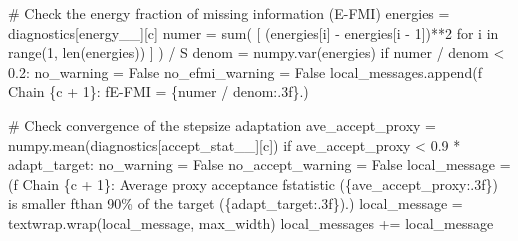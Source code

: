 \documentclass[
  letterpaper,
  DIV=11,
  numbers=noendperiod]{scrartcl}
\newenvironment{Shaded}{\begin{snugshade}}{\end{snugshade}}
\newcommand{\BuiltInTok}[1]{\textcolor[rgb]{0.00,0.23,0.31}{#1}}
\newcommand{\CommentTok}[1]{\textcolor[rgb]{0.37,0.37,0.37}{#1}}
\newcommand{\ControlFlowTok}[1]{\textcolor[rgb]{0.00,0.23,0.31}{#1}}
\newcommand{\DecValTok}[1]{\textcolor[rgb]{0.68,0.00,0.00}{#1}}
\newcommand{\FloatTok}[1]{\textcolor[rgb]{0.68,0.00,0.00}{#1}}
\newcommand{\KeywordTok}[1]{\textcolor[rgb]{0.00,0.23,0.31}{#1}}
\newcommand{\NormalTok}[1]{\textcolor[rgb]{0.00,0.23,0.31}{#1}}
\newcommand{\OperatorTok}[1]{\textcolor[rgb]{0.37,0.37,0.37}{#1}}
\newcommand{\SpecialCharTok}[1]{\textcolor[rgb]{0.37,0.37,0.37}{#1}}
\newcommand{\SpecialStringTok}[1]{\textcolor[rgb]{0.13,0.47,0.30}{#1}}
\newcommand{\StringTok}[1]{\textcolor[rgb]{0.13,0.47,0.30}{#1}}
\newcommand{\VariableTok}[1]{\textcolor[rgb]{0.07,0.07,0.07}{#1}}
\begin{document}
\begin{Shaded}
\begin{Highlighting}[]
    \CommentTok{\# Check the energy fraction of missing information (E{-}FMI)}
\NormalTok{    energies }\OperatorTok{=}\NormalTok{ diagnostics[}\StringTok{\textquotesingle{}energy\_\_\textquotesingle{}}\NormalTok{][c]}
\NormalTok{    numer }\OperatorTok{=} \BuiltInTok{sum}\NormalTok{( [ (energies[i] }\OperatorTok{{-}}\NormalTok{ energies[i }\OperatorTok{{-}} \DecValTok{1}\NormalTok{])}\OperatorTok{**}\DecValTok{2} 
                   \ControlFlowTok{for}\NormalTok{ i }\KeywordTok{in} \BuiltInTok{range}\NormalTok{(}\DecValTok{1}\NormalTok{, }\BuiltInTok{len}\NormalTok{(energies)) ] ) }\OperatorTok{/}\NormalTok{ S}
\NormalTok{    denom }\OperatorTok{=}\NormalTok{ numpy.var(energies)}
    \ControlFlowTok{if}\NormalTok{ numer }\OperatorTok{/}\NormalTok{ denom }\OperatorTok{\textless{}} \FloatTok{0.2}\NormalTok{:}
\NormalTok{      no\_warning }\OperatorTok{=} \VariableTok{False}
\NormalTok{      no\_efmi\_warning }\OperatorTok{=} \VariableTok{False}
\NormalTok{      local\_messages.append(}\SpecialStringTok{f\textquotesingle{}  Chain }\SpecialCharTok{\{}\NormalTok{c }\OperatorTok{+} \DecValTok{1}\SpecialCharTok{\}}\SpecialStringTok{: \textquotesingle{}}
                            \SpecialStringTok{f\textquotesingle{}E{-}FMI = }\SpecialCharTok{\{}\NormalTok{numer }\OperatorTok{/}\NormalTok{ denom}\SpecialCharTok{:.3f\}}\SpecialStringTok{.\textquotesingle{}}\NormalTok{)}
    
    \CommentTok{\# Check convergence of the stepsize adaptation}
\NormalTok{    ave\_accept\_proxy }\OperatorTok{=}\NormalTok{ numpy.mean(diagnostics[}\StringTok{\textquotesingle{}accept\_stat\_\_\textquotesingle{}}\NormalTok{][c])}
    \ControlFlowTok{if}\NormalTok{ ave\_accept\_proxy }\OperatorTok{\textless{}} \FloatTok{0.9} \OperatorTok{*}\NormalTok{ adapt\_target:}
\NormalTok{      no\_warning }\OperatorTok{=} \VariableTok{False}
\NormalTok{      no\_accept\_warning }\OperatorTok{=} \VariableTok{False}
\NormalTok{      local\_message }\OperatorTok{=}\NormalTok{ (}\SpecialStringTok{f\textquotesingle{}  Chain }\SpecialCharTok{\{}\NormalTok{c }\OperatorTok{+} \DecValTok{1}\SpecialCharTok{\}}\SpecialStringTok{: Average proxy acceptance \textquotesingle{}}
                       \SpecialStringTok{f\textquotesingle{}statistic (}\SpecialCharTok{\{}\NormalTok{ave\_accept\_proxy}\SpecialCharTok{:.3f\}}\SpecialStringTok{) is smaller \textquotesingle{}}
                       \SpecialStringTok{f\textquotesingle{}than 90\% of the target (}\SpecialCharTok{\{}\NormalTok{adapt\_target}\SpecialCharTok{:.3f\}}\SpecialStringTok{).\textquotesingle{}}\NormalTok{)}
\NormalTok{      local\_message }\OperatorTok{=}\NormalTok{ textwrap.wrap(local\_message, max\_width)}
\NormalTok{      local\_messages }\OperatorTok{+=}\NormalTok{ local\_message}
    

\end{Highlighting}
\end{Shaded}
\end{document}
